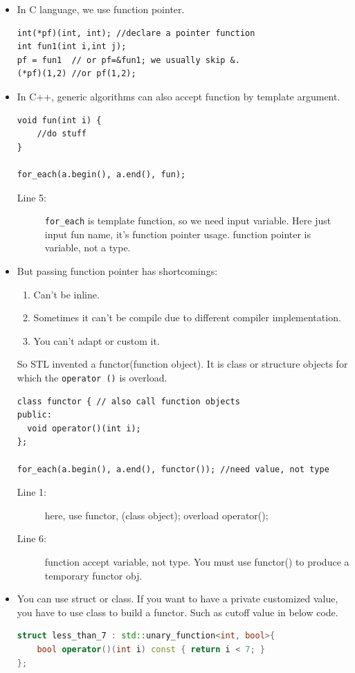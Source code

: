 \documentclass[a4paper,11pt,twoside]{book}
\begin{document}
\begin{itemize}
	
	\item  In C language, we use function pointer.
\begin{lstlisting}[numbers=none]
int(*pf)(int, int); //declare a pointer function
int fun1(int i,int j);
pf = fun1  // or pf=&fun1; we usually skip &.
(*pf)(1,2) //or pf(1,2);
\end{lstlisting}

	\item In C++, generic algorithms can also accept function by template argument.
\begin{lstlisting}[]
void fun(int i) {
	//do stuff
}

for_each(a.begin(), a.end(), fun);
\end{lstlisting}
\begin{description}
	\item[Line 5:] \texttt{for\_each} is template function, so we need input variable. Here just input fun name, it's function pointer usage. function pointer is variable, not a type.
\end{description}

\item But passing function pointer has shortcomings:
\begin{enumerate}
	\item Can't be inline.
	\item Sometimes it can't be compile due to different compiler implementation.
	\item You can't adapt or custom it.
\end{enumerate}
So STL invented a functor(function object). It is class or structure objects for which the \texttt{operator ()} is overload.

\begin{lstlisting}
class functor { // also call function objects
public:
  void operator()(int i);
};

for_each(a.begin(), a.end(), functor()); //need value, not type
\end{lstlisting}
\begin{description}
	\item[Line 1:] here, use functor, (class object); overload operator();
	\item[Line 6:] function accept variable, not type. You must use functor() to produce a temporary functor obj.
\end{description}

	\item  You can use struct or class. If you want to have a private customized value, you have to use class to build a functor.  Such as cutoff value in below code.
\begin{lstlisting}[frame=single, language=c++]
struct less_than_7 : std::unary_function<int, bool>{
    bool operator()(int i) const { return i < 7; }
};


\end{lstlisting}
\end{itemize}
\end{document}
